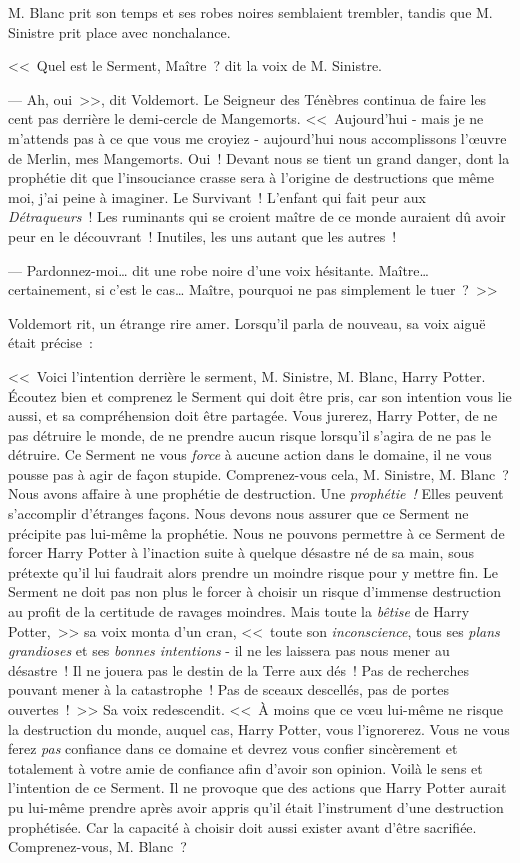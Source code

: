 M. Blanc prit son temps et ses robes noires semblaient trembler, tandis que M. Sinistre prit place avec nonchalance.

<<~Quel est le Serment, Maître~? dit la voix de M. Sinistre.

--- Ah, oui~>>, dit Voldemort. Le Seigneur des Ténèbres continua de faire les cent pas derrière le demi-cercle de Mangemorts. <<~Aujourd'hui - mais je ne m'attends pas à ce que vous me croyiez - aujourd'hui nous accomplissons l'œuvre de Merlin, mes Mangemorts. Oui~! Devant nous se tient un grand danger, dont la prophétie dit que l'insouciance crasse sera à l'origine de destructions que même moi, j'ai peine à imaginer. Le Survivant~! L'enfant qui fait peur aux \emph{Détraqueurs}~! Les ruminants qui se croient maître de ce monde auraient dû avoir peur en le découvrant~! Inutiles, les uns autant que les autres~!

--- Pardonnez-moi… dit une robe noire d'une voix hésitante. Maître… certainement, si c'est le cas… Maître, pourquoi ne pas simplement le tuer~?~>>

Voldemort rit, un étrange rire amer. Lorsqu'il parla de nouveau, sa voix aiguë était précise~:

<<~Voici l'intention derrière le serment, M. Sinistre, M. Blanc, Harry Potter. Écoutez bien et comprenez le Serment qui doit être pris, car son intention vous lie aussi, et sa compréhension doit être partagée. Vous jurerez, Harry Potter, de ne pas détruire le monde, de ne prendre aucun risque lorsqu'il s'agira de ne pas le détruire. Ce Serment ne vous \emph{force} à aucune action dans le domaine, il ne vous pousse pas à agir de façon stupide. Comprenez-vous cela, M. Sinistre, M. Blanc~? Nous avons affaire à une prophétie de destruction. Une \emph{prophétie~!} Elles peuvent s'accomplir d'étranges façons. Nous devons nous assurer que ce Serment ne précipite pas lui-même la prophétie. Nous ne pouvons permettre à ce Serment de forcer Harry Potter à l'inaction suite à quelque désastre né de sa main, sous prétexte qu'il lui faudrait alors prendre un moindre risque pour y mettre fin. Le Serment ne doit pas non plus le forcer à choisir un risque d'immense destruction au profit de la certitude de ravages moindres. Mais toute la \emph{bêtise} de Harry Potter,~>> sa voix monta d'un cran, <<~toute son \emph{inconscience}, tous ses \emph{plans grandioses} et ses \emph{bonnes intentions} - il ne les laissera pas nous mener au désastre~! Il ne jouera pas le destin de la Terre aux dés~! Pas de recherches pouvant mener à la catastrophe~! Pas de sceaux descellés, pas de portes ouvertes~!~>> Sa voix redescendit. <<~À moins que ce vœu lui-même ne risque la destruction du monde, auquel cas, Harry Potter, vous l'ignorerez. Vous ne vous ferez \emph{pas} confiance dans ce domaine et devrez vous confier sincèrement et totalement à votre amie de confiance afin d'avoir son opinion. Voilà le sens et l'intention de ce Serment. Il ne provoque que des actions que Harry Potter aurait pu lui-même prendre après avoir appris qu'il était l'instrument d'une destruction prophétisée. Car la capacité à choisir doit aussi exister avant d'être sacrifiée. Comprenez-vous, M. Blanc~?

